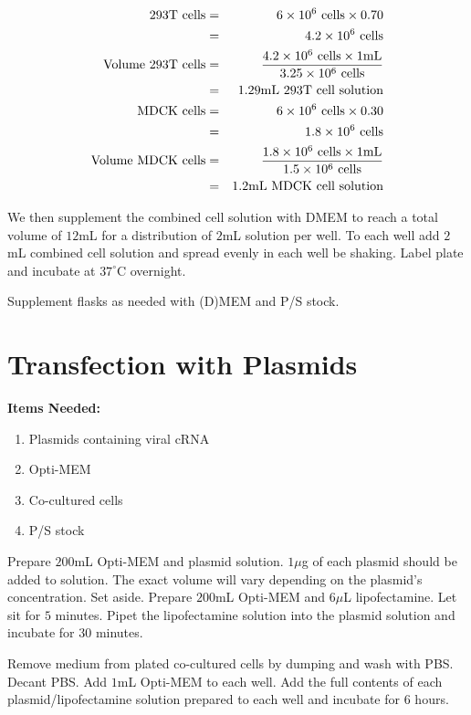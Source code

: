 \begin{eqnarray*}
%
%
\text{293T cells} &=& 6\e{6}\text{ cells} \times 0.70 \\
&=& 4.2\e{6}\text{ cells} \\
\text{Volume 293T cells} &=& \frac{4.2\e{6}\text{ cells} \times 1\text{mL}}{3.25\e{6}\text{ cells}} \\
&=& 1.29\text{mL 293T cell solution} \\
%
%
\text{MDCK cells} &=& 6\e{6}\text{ cells} \times 0.30 \\
&=& 1.8\e{6}\text{ cells} \\
\text{Volume MDCK cells} &=& \frac{1.8\e{6}\text{ cells} \times 1\text{mL}}{1.5\e{6}\text{ cells}} \\
&=& 1.2\text{mL MDCK cell solution} \\
\end{eqnarray*}

We then supplement the combined cell solution with DMEM to reach a total volume of $12$mL for a distribution of $2$mL solution per well. To each well add $2$mL combined cell solution and spread evenly in each well be shaking. Label plate and incubate at $37^{\circ}$C overnight.

Supplement flasks as needed with (D)MEM and P/S stock.

\section{Transfection with Plasmids}

{\bfseries Items Needed:}
\begin{enumerate}
	\item Plasmids containing viral cRNA
	\item Opti-MEM
	\item Co-cultured cells
	\item P/S stock
\end{enumerate}

Prepare $200$mL Opti-MEM and plasmid solution. $1\mu$g of each plasmid should be added to solution. The exact volume will vary depending on the plasmid's concentration. Set aside. Prepare $200$mL Opti-MEM and $6\mu$L lipofectamine. Let sit for $5$ minutes. Pipet the lipofectamine solution into the plasmid solution and incubate for $30$ minutes.

Remove medium from plated co-cultured cells by dumping and wash with PBS. Decant PBS. Add $1$mL Opti-MEM to each well. Add the full contents of each plasmid/lipofectamine solution prepared to each well and incubate for $6$ hours.